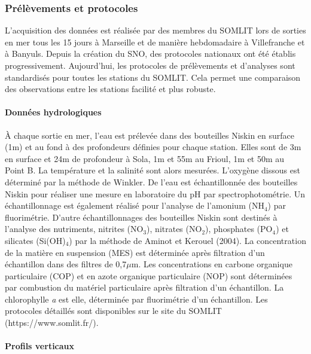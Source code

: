 \documentclass[12pt]{article}
\begin{document}
\subsubsection{Prélèvements et protocoles}

L’acquisition des données est réalisée par des membres du SOMLIT lors de sorties en mer tous les 15 jours à Marseille et de manière hebdomadaire à Villefranche et à Banyuls. Depuis la création du SNO, des protocoles nationaux ont été établis progressivement. Aujourd’hui, les protocoles de prélèvements et d’analyses sont standardisés pour toutes les stations du SOMLIT. Cela permet une comparaison des observations entre les stations facilité et plus robuste. 

\paragraph{Données hydrologiques\\}

À chaque sortie en mer, l’eau est prélevée dans des bouteilles Niskin en surface (1m) et au fond à des profondeurs définies pour chaque station. Elles sont de 3m en surface et 24m de profondeur à Sola, 1m et 55m au Frioul, 1m et 50m au Point B. La température et la salinité sont alors mesurées. L’oxygène dissous est déterminé par la méthode de Winkler. De l’eau est échantillonnée des bouteilles Niskin pour réaliser une mesure en laboratoire du pH par spectrophotométrie. Un échantillonnage est également réalisé pour l’analyse de l’amonium (NH$_4$) par fluorimétrie. D’autre échantillonnages des bouteilles Niskin sont destinés à l’analyse des nutriments, nitrites (NO$_3$), nitrates (NO$_2$), phosphates (PO$_4$) et silicates (Si(OH)$_4$) par la méthode de Aminot et Kerouel (2004). La concentration de la matière en suspension (MES) est déterminée après filtration d’un échantillon dans des filtres de 0,7$\mu$m. Les concentrations en carbone organique particulaire (COP) et en azote organique particulaire (NOP) sont déterminées par combustion du matériel particulaire après filtration d’un échantillon. La chlorophylle \textit{a} est elle, déterminée par fluorimétrie d’un échantillon. Les protocoles détaillés sont disponibles sur le site du SOMLIT (https://www.somlit.fr/). 


\paragraph{Profils verticaux\\}
\end{document}
